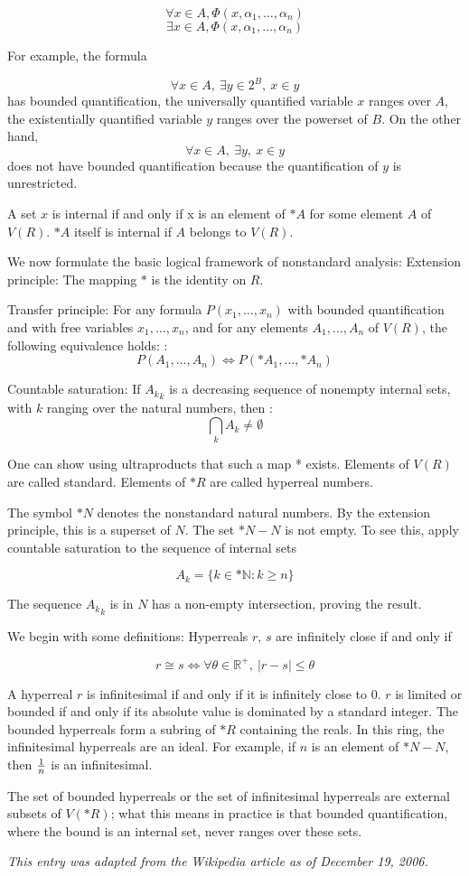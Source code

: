 \documentclass[12pt]{article}
\begin{document}
$$ \forall x \in A, \Phi(x, \alpha_1, \ldots, \alpha_n) $$
$$ \exists x \in A, \Phi(x, \alpha_1, \ldots, \alpha_n) $$

For example, the formula

$$ \forall x \in A, \ \exists y \in 2^B, \ x \in y $$
has bounded quantification, the universally quantified variable $x$ ranges over $A$, the existentially quantified variable $y$ ranges over the powerset of $B$. On the other hand, 
$$ \forall x \in A, \ \exists y, \ x \in y $$
does not have bounded quantification because the quantification of $y$ is unrestricted.

A set $x$ is internal if and only if x is an element of $*A$ for some element 
$A$ of $V(R)$. $*A$ itself is internal if $A$ belongs to $V(R)$.

We now formulate the basic logical framework of nonstandard analysis:
 Extension principle: The mapping $*$ is the identity on $R$.

Transfer principle: For any formula $P(x_1, \ldots, x_n)$ with bounded quantification and with free variables $x_1, \ldots, x_n$, and for any elements $A_1, \ldots, A_n$ of $V(R)$, the following equivalence holds: 
:$$P(A_1, \ldots, A_n) \iff P(*A_1, \ldots, *A_n) $$

Countable saturation: If ${A_k}_k$ is a decreasing sequence of nonempty internal sets, with $k$ ranging over the natural numbers, then 
:$$\bigcap_k A_k \neq \emptyset $$

One can show using ultraproducts that such a map * exists. Elements of $V(R)$ are called standard. Elements of $*R$ are called hyperreal numbers.

The symbol $*N$ denotes the nonstandard natural numbers. By the extension principle, this is a superset of $N$. The set $*N - N$ is not empty. To see this, apply countable saturation to the sequence of internal sets

$$ A_k = \{k \in *\mathbb{N}: k \geq n\} $$

The sequence ${A_k}_k$ is in $N$ has a non-empty intersection, proving the result.

We begin with some definitions: Hyperreals $r$, $s$ are infinitely close if and only if 

$$ r \cong s \iff \forall \theta \in \mathbb{R}^+, \ |r - s| \leq \theta$$

A hyperreal $r$ is infinitesimal if and only if it is infinitely close to 0. $r$ is limited or bounded if and only if its absolute value is dominated by a standard integer.
The bounded hyperreals form a subring of $*R$ containing the reals. In this ring, the infinitesimal hyperreals are an ideal. For example, if $n$ is an element of $*N - N$, then ${1 \over n}$ is an infinitesimal.

The set of bounded hyperreals or the set of infinitesimal hyperreals are external subsets of $V(*R)$; what this means in practice is that bounded quantification, where the bound is an internal set, never ranges over these sets.

{\it This entry was adapted from the Wikipedia article  as of December 19, 2006.}
\end{document}
